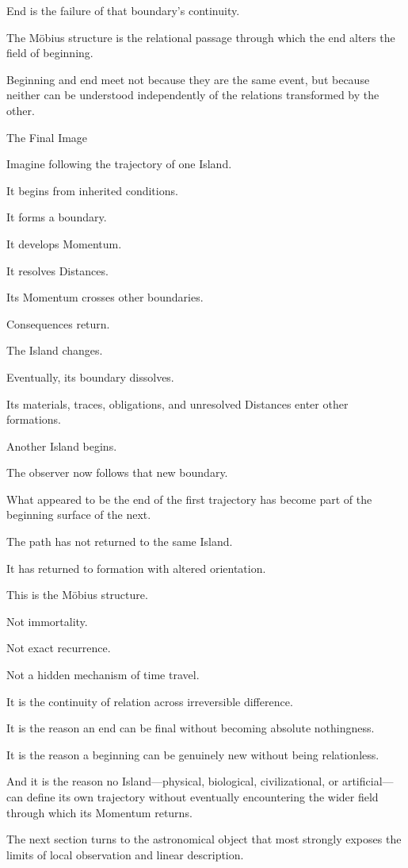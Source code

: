 End is the failure of that boundary’s continuity.

The Möbius structure is the relational passage through which the end alters the field of beginning.

Beginning and end meet not because they are the same event, but because neither can be understood independently of the relations transformed by the other.

The Final Image

Imagine following the trajectory of one Island.

It begins from inherited conditions.

It forms a boundary.

It develops Momentum.

It resolves Distances.

Its Momentum crosses other boundaries.

Consequences return.

The Island changes.

Eventually, its boundary dissolves.

Its materials, traces, obligations, and unresolved Distances enter other formations.

Another Island begins.

The observer now follows that new boundary.

What appeared to be the end of the first trajectory has become part of the beginning surface of the next.

The path has not returned to the same Island.

It has returned to formation with altered orientation.

This is the Möbius structure.

Not immortality.

Not exact recurrence.

Not a hidden mechanism of time travel.

It is the continuity of relation across irreversible difference.

It is the reason an end can be final without becoming absolute nothingness.

It is the reason a beginning can be genuinely new without being relationless.

And it is the reason no Island—physical, biological, civilizational, or artificial—can define its own trajectory without eventually encountering the wider field through which its Momentum returns.

The next section turns to the astronomical object that most strongly exposes the limits of local observation and linear description.

